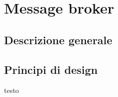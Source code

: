 \section{Message broker}
\subsection{Descrizione generale}

\subsection{Principi di design}
testo


